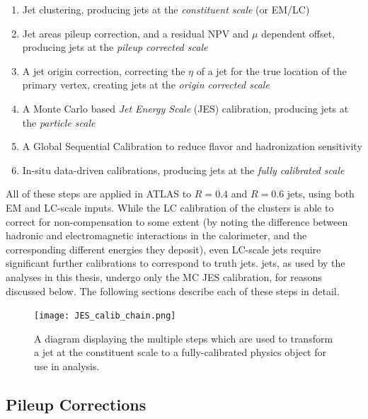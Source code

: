 \begin{enumerate}
	\item Jet clustering, producing jets at the \textit{constituent scale} (or EM/LC)
	\item Jet areas pileup correction, and a residual NPV and $\mu$ dependent offset, producing jets at the \textit{pileup corrected scale}
	\item A jet origin correction, correcting the $\eta$ of a jet for the true location of the primary vertex, creating jets at the \textit{origin corrected scale}
	\item A Monte Carlo based \textit{Jet Energy Scale} (JES) calibration, producing jets at the \textit{particle scale}
	\item A Global Sequential Calibration to reduce flavor and hadronization sensitivity
	\item In-situ data-driven calibrations, producing jets at the \textit{fully calibrated scale}
\end{enumerate}

All of these steps are applied in ATLAS to $R=0.4$ and $R=0.6$ jets, using both EM and LC-scale inputs. While the LC calibration of the clusters is able to correct for non-compensation to some extent (by noting the difference between hadronic and electromagnetic interactions in the calorimeter, and the corresponding different energies they deposit), even LC-scale jets require significant further calibrations to correspond to truth jets. \LargeR jets, as used by the analyses in this thesis, undergo only the MC JES calibration, for reasons discussed below. The following sections describe each of these steps in detail.


\begin{figure}
\centering
\texttt{[image: JES\_calib\_chain.png]}
\label{fig:jet-reconstruction:making-jets}
\caption{A diagram displaying the multiple steps which are used to transform a jet at the constituent scale to a fully-calibrated physics object for use in analysis.}
\end{figure}


\subsection{Pileup Corrections}


